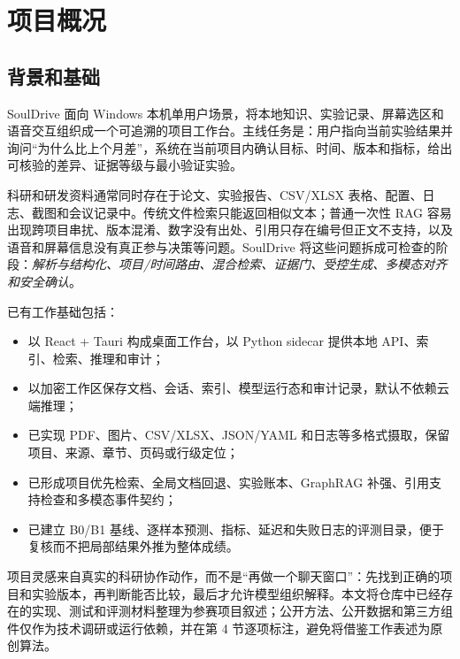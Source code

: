 \documentclass[UTF8,12pt]{ctexart}
\begin{document}
\section{项目概况}

\subsection{背景和基础}

\begin{keybox}[title={项目定位}]
SoulDrive 面向 Windows 本机单用户场景，将本地知识、实验记录、屏幕选区和语音交互组织成一个可追溯的项目工作台。主线任务是：用户指向当前实验结果并询问“为什么比上个月差”，系统在当前项目内确认目标、时间、版本和指标，给出可核验的差异、证据等级与最小验证实验。
\end{keybox}

科研和研发资料通常同时存在于论文、实验报告、CSV/XLSX 表格、配置、日志、截图和会议记录中。传统文件检索只能返回相似文本；普通一次性 RAG 容易出现跨项目串扰、版本混淆、数字没有出处、引用只存在编号但正文不支持，以及语音和屏幕信息没有真正参与决策等问题。SoulDrive 将这些问题拆成可检查的阶段：\emph{解析与结构化、项目/时间路由、混合检索、证据门、受控生成、多模态对齐和安全确认}。

已有工作基础包括：
\begin{itemize}
  \item 以 React + Tauri 构成桌面工作台，以 Python sidecar 提供本地 API、索引、检索、推理和审计；
  \item 以加密工作区保存文档、会话、索引、模型运行态和审计记录，默认不依赖云端推理；
  \item 已实现 PDF、图片、CSV/XLSX、JSON/YAML 和日志等多格式摄取，保留项目、来源、章节、页码或行级定位；
  \item 已形成项目优先检索、全局文档回退、实验账本、GraphRAG 补强、引用支持检查和多模态事件契约；
  \item 已建立 B0/B1 基线、逐样本预测、指标、延迟和失败日志的评测目录，便于复核而不把局部结果外推为整体成绩。
\end{itemize}

项目灵感来自真实的科研协作动作，而不是“再做一个聊天窗口”：先找到正确的项目和实验版本，再判断能否比较，最后才允许模型组织解释。本文将仓库中已经存在的实现、测试和评测材料整理为参赛项目叙述；公开方法、公开数据和第三方组件仅作为技术调研或运行依赖，并在第 4 节逐项标注，避免将借鉴工作表述为原创算法。
\end{document}
